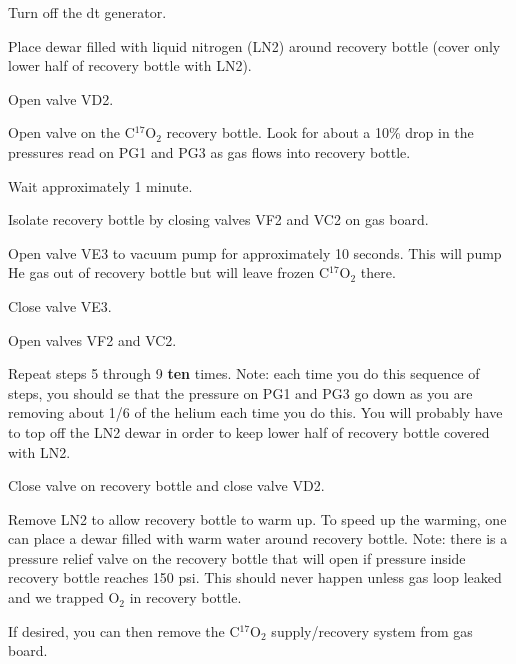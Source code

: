 \begin{enumerate}

\checkitem Turn off the dt generator.
  
\checkitem Place dewar filled with liquid nitrogen (LN2) around 
  recovery bottle (cover only lower half of recovery bottle with LN2).
 
\checkitem Open valve VD2.
 
\checkitem Open valve on the  C$^{17}$O$_{2}$ recovery bottle.  Look
  for about a 10\% drop in the pressures read on PG1 and PG3 as gas
  flows into recovery bottle.
  
\checkitem Wait approximately 1 minute.
  
\checkitem Isolate recovery bottle by closing valves VF2 and VC2 on gas
  board.
  
\checkitem Open valve VE3 to vacuum pump for approximately 10 seconds.
 This will pump He gas out of recovery bottle but will leave
  frozen  C$^{17}$O$_{2}$ there.
  
\checkitem Close valve VE3.
  
\checkitem Open valves VF2 and VC2.
  
\checkitem Repeat steps 5 through 9 {\bf ten} times.  Note:  each time
  you do this sequence of steps, you should se that the pressure on PG1
  and PG3 go down as you are removing about 1/6 of the helium each time
  you do this.  You will probably have to top off the LN2
  dewar in order to keep lower half of recovery bottle covered with LN2.
  
\checkitem  Close valve on recovery bottle and close valve VD2.
  
\checkitem  Remove LN2 to allow recovery bottle to warm up.
  To speed up the warming, one can place a dewar filled with warm
  water around recovery bottle.  Note: there is a pressure relief
  valve on the recovery bottle that will open if pressure inside
  recovery bottle reaches 150 psi.  This should never happen unless
  gas loop leaked and we trapped O$_{2}$ in recovery bottle.
  
\checkitem If desired, you can then remove the  C$^{17}$O$_{2}$ 
  supply/recovery system from gas board.



\end{enumerate}





